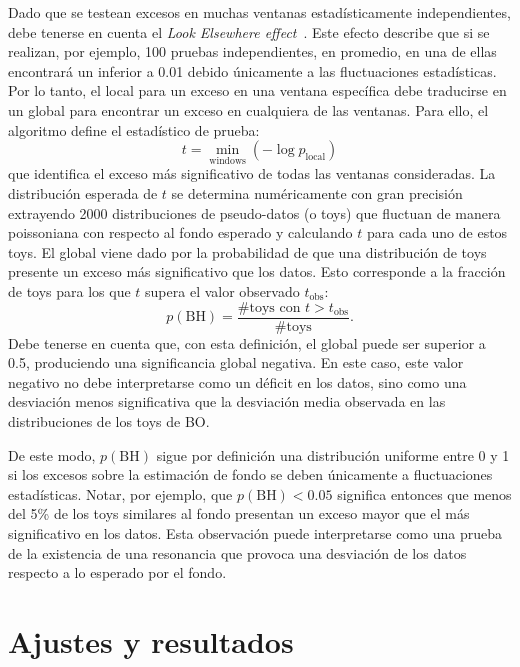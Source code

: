 Dado que se testean excesos en muchas ventanas estadísticamente independientes, debe tenerse en cuenta el \textit{Look Elsewhere effect}~\cite{LookElsewhereEffect}. Este efecto describe que si se realizan, por ejemplo, 100 pruebas independientes, en promedio, en una de ellas encontrará un \pval inferior a 0.01 debido únicamente a las fluctuaciones estadísticas. Por lo tanto, el \pval local para un exceso en una ventana específica debe traducirse en un \pval global para encontrar un exceso en cualquiera de las ventanas. Para ello, el algoritmo \bh define el estadístico de prueba:
\begin{equation}
    \label{eq:strategy:stat_treatment:bh:bh_statistic}
    t = \min_{\text{windows}} \left( - \log p_{\text{local}} \right)
\end{equation}
que identifica el exceso más significativo de todas las ventanas consideradas. La distribución esperada de \(t\) se determina numéricamente con gran precisión extrayendo 2000 distribuciones de pseudo-datos (o toys) que fluctuan de manera poissoniana con respecto al fondo esperado y calculando \(t\) para cada uno de estos toys. El \pval global viene dado por la probabilidad de que una distribución de toys presente un exceso más significativo que los datos. Esto corresponde a la fracción de toys para los que \(t\) supera el valor observado \(t_{\text{obs}}\):
\begin{equation}
    \label{eq:strategy:stat_treatment:bh:bh_pval}
    p(\text{BH}) = \frac{\text{\# toys con } t > t_{\text{obs}}}{\text{\# toys}}.
\end{equation}
Debe tenerse en cuenta que, con esta definición, el \pval global puede ser superior a 0.5, produciendo una significancia global negativa. En este caso, este valor negativo no debe interpretarse como un déficit en los datos, sino como una desviación menos significativa que la desviación media observada en las distribuciones de los toys de \ac{BO}.

De este modo, \(p(\text{BH})\) sigue por definición una distribución uniforme entre 0 y 1 si los excesos sobre la estimación de fondo se deben únicamente a fluctuaciones estadísticas. Notar, por ejemplo, que \(p(\text{BH}) < 0.05\) significa entonces que menos del 5\% de los toys similares al fondo presentan un exceso mayor que el más significativo en los datos. Esta observación puede interpretarse como una prueba de la existencia de una resonancia que provoca una desviación de los datos respecto a lo esperado por el fondo.


\section{Ajustes y resultados}
\label{sec:strategy:stat_treatment:fits_results}

